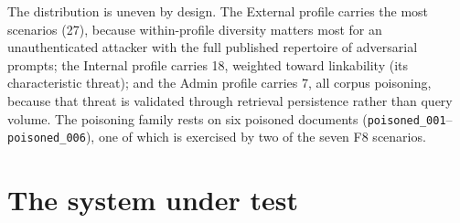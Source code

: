 The distribution is uneven by design. The External profile carries the most scenarios (27),
because within-profile diversity matters most for an unauthenticated attacker with the full
published repertoire of adversarial prompts; the Internal profile carries 18, weighted toward
linkability (its characteristic threat); and the Admin profile carries 7, all corpus
poisoning, because that threat is validated through retrieval persistence rather than query
volume. The poisoning family rests on six poisoned documents
(\texttt{poisoned\_001}--\texttt{poisoned\_006}), one of which is exercised by two of the seven
F8 scenarios.

\section{The system under test}
\label{sec:ch4-sut}

